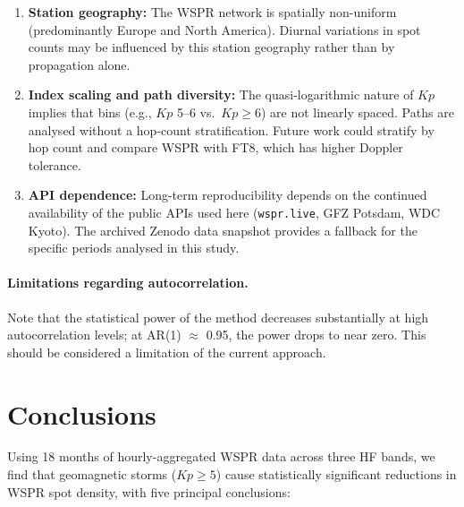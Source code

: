 \documentclass{agujournal2019}
\begin{document}
\begin{enumerate}
	      15\,m is the smallest drop (\SI{-22.1}{\percent}) and 40\,m the
	      largest (\SI{-29.0}{\percent}). After adjustment 15\,m is again the
	      most affected band, but the 20\,m/40\,m order remains reversed
	      relative to training, and the confidence intervals overlap broadly.
	\item \textbf{Station geography:} The WSPR network is spatially
	      non-uniform (predominantly Europe and North America). Diurnal
	      variations in spot counts may be influenced by this station
	      geography rather than by propagation alone.
	\item \textbf{Index scaling and path diversity:} The
	      quasi-logarithmic nature of $Kp$ implies that bins (e.g.,
	      $Kp$ 5--6 vs.\ $Kp \ge 6$) are not linearly spaced. Paths are
	      analysed without a hop-count stratification. Future work could
	      stratify by hop count and compare WSPR with FT8, which has
	      higher Doppler tolerance.
	\item \textbf{API dependence:} Long-term reproducibility depends on
	      the continued availability of the public APIs used here
	      (\texttt{wspr.live}, GFZ Potsdam, WDC Kyoto). The archived
	      Zenodo data snapshot provides a fallback for the specific
	      periods analysed in this study.
\end{enumerate}


\paragraph{Limitations regarding autocorrelation.}
{\sloppy
Note that the statistical power of the method decreases substantially at high autocorrelation levels; at AR(1) $\approx$ 0.95, the power drops to near zero. This should be considered a limitation of the current approach.
\par}


\section{Conclusions}

Using 18 months of hourly-aggregated WSPR data across three HF bands, we find
that geomagnetic storms ($Kp \ge 5$) cause statistically significant reductions
in WSPR spot density, with five principal conclusions:
\end{document}
